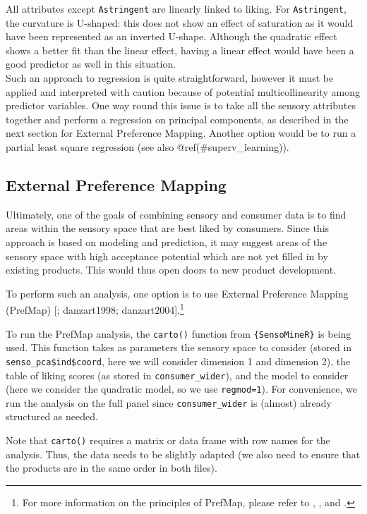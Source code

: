\documentclass[
]{krantz}
\begin{document}
All attributes except \texttt{Astringent} are linearly linked to liking. For \texttt{Astringent}, the curvature is U-shaped: this does not show an effect of saturation as it would have been represented as an inverted U-shape. Although the quadratic effect shows a better fit than the linear effect, having a linear effect would have been a good predictor as well in this situation.\\
Such an approach to regression is quite straightforward, however it must be applied and interpreted with caution because of potential multicollinearity among predictor variables. One way round this issue is to take all the sensory attributes together and perform a regression on principal components, as described in the next section for External Preference Mapping. Another option would be to run a partial least square regression (see also @ref(\#superv\_learning)).

\hypertarget{prefmap}{%
\subsection{External Preference Mapping}\label{prefmap}}

Ultimately, one of the goals of combining sensory and consumer data is to find areas within the sensory space that are best liked by consumers. Since this approach is based on modeling and prediction, it may suggest areas of the sensory space with high acceptance potential which are not yet filled in by existing products. This would thus open doors to new product development.

To perform such an analysis, one option is to use External Preference Mapping (PrefMap) {[}\citet{schlich1992}; danzart1998; danzart2004{]}.\footnote{For more information on the principles of PrefMap, please refer to \citet{macfie2007}, \citet{meullenet2008}, and \citet{Le2018}.}

To run the PrefMap analysis, the \texttt{carto()} function from \texttt{\{SensoMineR\}} is being used. This function takes as parameters the sensory space to consider (stored in \texttt{senso\_pca\$ind\$coord}, here we will consider dimension 1 and dimension 2), the table of liking scores (as stored in \texttt{consumer\_wider}), and the model to consider (here we consider the quadratic model, so we use \texttt{regmod=1}). For convenience, we run the analysis on the full panel since \texttt{consumer\_wider} is (almost) already structured as needed.

Note that \texttt{carto()} requires a matrix or data frame with row names for the analysis. Thus, the data needs to be slightly adapted (we also need to ensure that the products are in the same order in both files).
\end{document}
